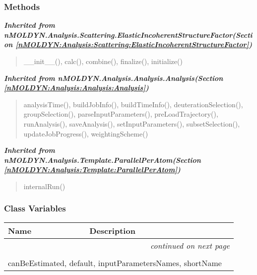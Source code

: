 
  \subsubsection{Methods}


\large{\textbf{\textit{Inherited from nMOLDYN.Analysis.Scattering.ElasticIncoherentStructureFactor\textit{(Section \ref{nMOLDYN:Analysis:Scattering:ElasticIncoherentStructureFactor})}}}}

\begin{quote}
\_\_init\_\_(), calc(), combine(), finalize(), initialize()
\end{quote}

\large{\textbf{\textit{Inherited from nMOLDYN.Analysis.Analysis.Analysis\textit{(Section \ref{nMOLDYN:Analysis:Analysis:Analysis})}}}}

\begin{quote}
analysisTime(), buildJobInfo(), buildTimeInfo(), deuterationSelection(), groupSelection(), parseInputParameters(), preLoadTrajectory(), runAnalysis(), saveAnalysis(), setInputParameters(), subsetSelection(), updateJobProgress(), weightingScheme()
\end{quote}

\large{\textbf{\textit{Inherited from nMOLDYN.Analysis.Template.ParallelPerAtom\textit{(Section \ref{nMOLDYN:Analysis:Template:ParallelPerAtom})}}}}

\begin{quote}
internalRun()
\end{quote}


  \subsubsection{Class Variables}

    \vspace{-1cm}
\hspace{\varindent}\begin{longtable}{|p{\varnamewidth}|p{\vardescrwidth}|l}
\cline{1-2}
\cline{1-2} \centering \textbf{Name} & \centering \textbf{Description}& \\
\cline{1-2}
\endhead\cline{1-2}\multicolumn{3}{r}{\small\textit{continued on next page}}\\\endfoot\cline{1-2}
\endlastfoot\multicolumn{2}{|l|}{\textit{Inherited from nMOLDYN.Analysis.Scattering.ElasticIncoherentStructureFactor \textit{(Section \ref{nMOLDYN:Analysis:Scattering:ElasticIncoherentStructureFactor})}}}\\
\multicolumn{2}{|p{\varwidth}|}{\raggedright canBeEstimated, default, inputParametersNames, shortName}\\
\cline{1-2}
\end{longtable}

